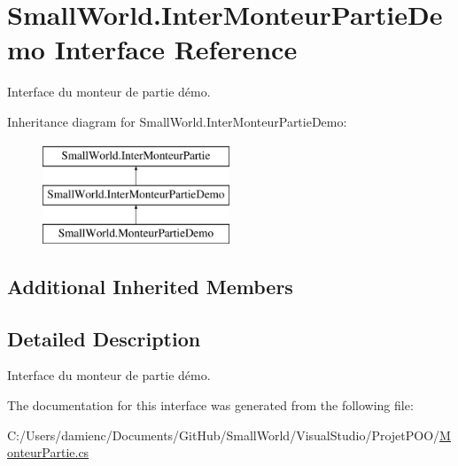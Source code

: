 \hypertarget{interface_small_world_1_1_inter_monteur_partie_demo}{\section{Small\-World.\-Inter\-Monteur\-Partie\-Demo Interface Reference}
\label{interface_small_world_1_1_inter_monteur_partie_demo}
}


Interface du monteur de partie démo.  


Inheritance diagram for Small\-World.\-Inter\-Monteur\-Partie\-Demo\-:\begin{figure}[H]
\begin{center}
\leavevmode
\includegraphics[height=3.000000cm]{interface_small_world_1_1_inter_monteur_partie_demo}
\end{center}
\end{figure}
\subsection*{Additional Inherited Members}


\subsection{Detailed Description}
Interface du monteur de partie démo. 

The documentation for this interface was generated from the following file\-:\begin{DoxyCompactItemize}
\item 
C\-:/\-Users/damienc/\-Documents/\-Git\-Hub/\-Small\-World/\-Visual\-Studio/\-Projet\-P\-O\-O/\hyperlink{_monteur_partie_8cs}{Monteur\-Partie.\-cs}\end{DoxyCompactItemize}
